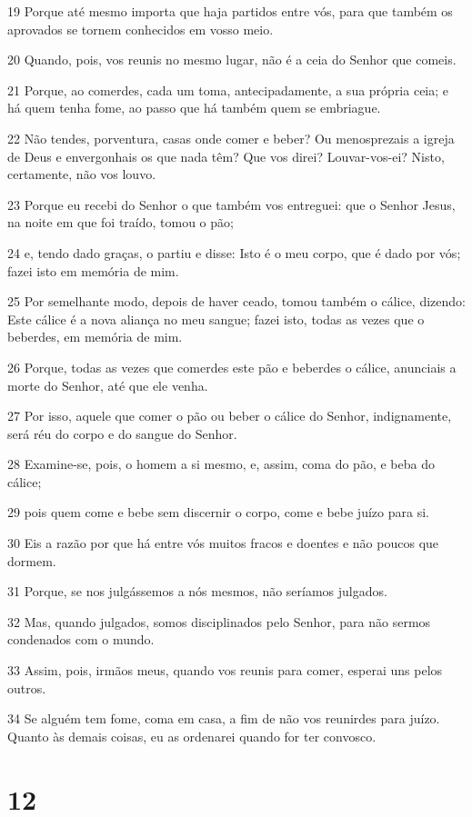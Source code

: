 \par 19 Porque até mesmo importa que haja partidos entre vós, para que também os aprovados se tornem conhecidos em vosso meio.
\par 20 Quando, pois, vos reunis no mesmo lugar, não é a ceia do Senhor que comeis.
\par 21 Porque, ao comerdes, cada um toma, antecipadamente, a sua própria ceia; e há quem tenha fome, ao passo que há também quem se embriague.
\par 22 Não tendes, porventura, casas onde comer e beber? Ou menosprezais a igreja de Deus e envergonhais os que nada têm? Que vos direi? Louvar-vos-ei? Nisto, certamente, não vos louvo.
\par 23 Porque eu recebi do Senhor o que também vos entreguei: que o Senhor Jesus, na noite em que foi traído, tomou o pão;
\par 24 e, tendo dado graças, o partiu e disse: Isto é o meu corpo, que é dado por vós; fazei isto em memória de mim.
\par 25 Por semelhante modo, depois de haver ceado, tomou também o cálice, dizendo: Este cálice é a nova aliança no meu sangue; fazei isto, todas as vezes que o beberdes, em memória de mim.
\par 26 Porque, todas as vezes que comerdes este pão e beberdes o cálice, anunciais a morte do Senhor, até que ele venha.
\par 27 Por isso, aquele que comer o pão ou beber o cálice do Senhor, indignamente, será réu do corpo e do sangue do Senhor.
\par 28 Examine-se, pois, o homem a si mesmo, e, assim, coma do pão, e beba do cálice;
\par 29 pois quem come e bebe sem discernir o corpo, come e bebe juízo para si.
\par 30 Eis a razão por que há entre vós muitos fracos e doentes e não poucos que dormem.
\par 31 Porque, se nos julgássemos a nós mesmos, não seríamos julgados.
\par 32 Mas, quando julgados, somos disciplinados pelo Senhor, para não sermos condenados com o mundo.
\par 33 Assim, pois, irmãos meus, quando vos reunis para comer, esperai uns pelos outros.
\par 34 Se alguém tem fome, coma em casa, a fim de não vos reunirdes para juízo. Quanto às demais coisas, eu as ordenarei quando for ter convosco.

\chapter{12}

